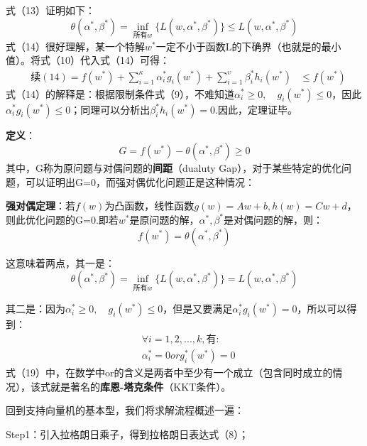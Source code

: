 式（13）证明如下：
\begin{equation}\theta(\alpha^*,\beta^*)=\inf_{\text{所有}w}\{L(w,\alpha^*,\beta^*)\}\leq L(w,\alpha^*,\beta^*)\end{equation}
式（14）很好理解，某一个特解$w^{*}$一定不小于函数L的下确界（也就是的最小值）。将式（10）代入式（14）可得：
\begin{equation}\begin{aligned}
		&\text{续}(14)=f(w^{*})+\sum_{i=1}^{\kappa}\alpha_{i}^{*}g_{i}(w^{*})+\sum_{i=1}^{\upsilon}\beta_{i}^{*}h_{i}(w^{*}) 
		&\leq f(w^{*})
\end{aligned}\end{equation}
式（14）的解释是：根据限制条件式（9），不难知道$\alpha_i^*\geq0 ,\quad g_i(w^*)\leq0$，因此$\alpha_i^*g_i(w^*)\leq0$；同理可以分析出$\beta_i^*h_i(w^*)=0$.因此，定理证毕。

\textbf{定义}：
\begin{equation}G=f(w^*)-\theta(\alpha^*,\beta^*)\geq0\end{equation}
其中，G称为原问题与对偶问题的\textbf{间距}（dualuty Gap），对于某些特定的优化问题，可以证明出G=0，而强对偶优化问题正是这种情况：
		
\textbf{强对偶定理}：若$f(w)$为凸函数，线性函数$g(w)=Aw+b,h(w)=Cw+d$，则此优化问题的G=0.即若$w^{*}$是原问题的解，$\alpha^*,\beta^*$是对偶问题的解，则：
\begin{equation}f(w^*)=\theta(\alpha^*,\beta^*)\end{equation}

这意味着两点，其一是：
\begin{equation}\theta(\alpha^*,\beta^*)=\inf_{\text{所有}w}\{L(w,\alpha^*,\beta^*)\}=L(w,\alpha^*,\beta^*)\end{equation}

其二是：因为$\alpha_{i}^{*}\geq0 ,\quad g_{i}(w^{*})\leq0$，但是又要满足$\alpha_i^*g_i(w^*)=0$，所以可以得到：
\begin{equation}\begin{aligned}&\forall i=1,2,...,k,\text{有:}\\&\alpha_{i}^{*}=0 or g_{i}^{*}(w^{*})=0\end{aligned}\end{equation}
式（19）中，在数学中or的含义是两者中至少有一个成立（包含同时成立的情况），该式就是著名的\textbf{库恩-塔克条件}（KKT条件）。

回到支持向量机的基本型，我们将求解流程概述一遍：

Step1：引入拉格朗日乘子，得到拉格朗日表达式（8）；

